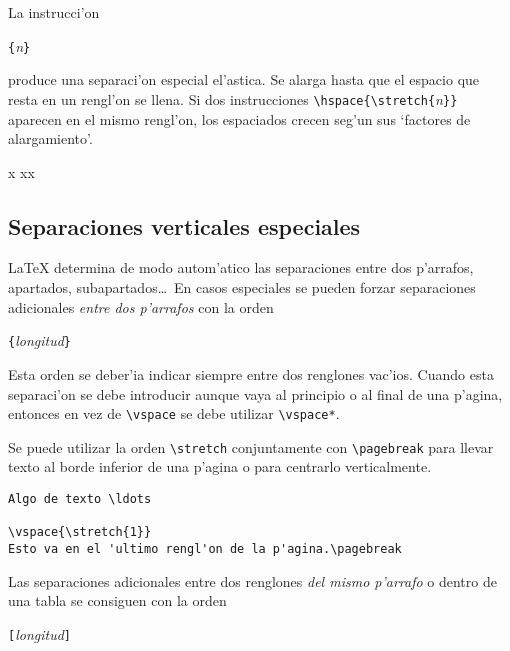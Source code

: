 La instrucci'on
\begin{command}
\verb|{|\emph{n}\verb|}|
\end{command} 
\noindent produce una separaci'on especial el'astica. Se alarga hasta
que el espacio que resta en un rengl'on se llena. Si dos instrucciones
\verb|\hspace{\stretch{|\emph{n}\verb|}}| aparecen en el mismo
rengl'on, los espaciados crecen seg'un sus `factores de alargamiento'.
\begin{example}
x
xx
\end{example}

\subsection{Separaciones verticales especiales}

\LaTeX{} determina de modo autom'atico las separaciones entre dos
p'arrafos, apartados, subapartados\ldots\ En casos especiales se
pueden forzar separaciones adicionales \emph{entre dos p'arrafos} con
la orden
\begin{command}
\verb|{|\emph{longitud}\verb|}|
\end{command}

Esta orden se deber'ia indicar siempre entre dos renglones vac'ios.
Cuando esta separaci'on se debe introducir aunque vaya al principio o
al final de una p'agina, entonces en vez de \verb|\vspace| se debe
utilizar \verb|\vspace*|. 

Se puede utilizar la orden \verb|\stretch| conjuntamente con
\verb|\pagebreak| para llevar texto al borde inferior de una
p'agina o para centrarlo verticalmente.

\begin{code}
\begin{verbatim}
Algo de texto \ldots

\vspace{\stretch{1}}
Esto va en el 'ultimo rengl'on de la p'agina.\pagebreak
\end{verbatim}
\end{code}

Las separaciones adicionales entre dos renglones \emph{del mismo
p'arrafo} o dentro de una tabla se consiguen con la orden
\begin{command}
\ci{\bs}\verb|[|\emph{longitud}\verb|]|
\end{command}

